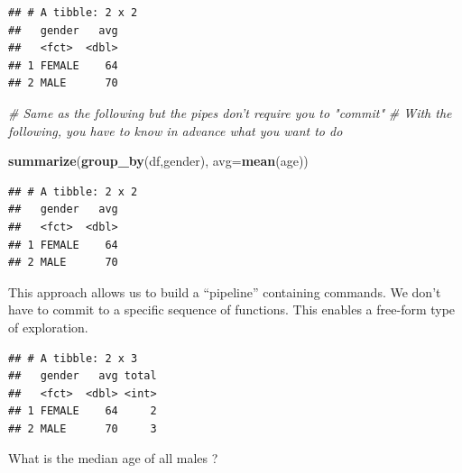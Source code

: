 \documentclass[]{book}
\newenvironment{Shaded}{\begin{snugshade}}{\end{snugshade}}
\newcommand{\CommentTok}[1]{\textcolor[rgb]{0.56,0.35,0.01}{\textit{#1}}}
\newcommand{\DataTypeTok}[1]{\textcolor[rgb]{0.13,0.29,0.53}{#1}}
\newcommand{\KeywordTok}[1]{\textcolor[rgb]{0.13,0.29,0.53}{\textbf{#1}}}
\newcommand{\NormalTok}[1]{#1}
\newcommand{\OperatorTok}[1]{\textcolor[rgb]{0.81,0.36,0.00}{\textbf{#1}}}
\newcommand{\StringTok}[1]{\textcolor[rgb]{0.31,0.60,0.02}{#1}}
\begin{document}
\begin{verbatim}
## # A tibble: 2 x 2
##   gender   avg
##   <fct>  <dbl>
## 1 FEMALE    64
## 2 MALE      70
\end{verbatim}

\begin{Shaded}
\begin{Highlighting}[]
\CommentTok{# Same as the following but the pipes don't require you to "commit"}
\CommentTok{# With the following, you have to know in advance what you want to do}

\KeywordTok{summarize}\NormalTok{(}\KeywordTok{group_by}\NormalTok{(df,gender), }\DataTypeTok{avg=}\KeywordTok{mean}\NormalTok{(age))}
\end{Highlighting}
\end{Shaded}

\begin{verbatim}
## # A tibble: 2 x 2
##   gender   avg
##   <fct>  <dbl>
## 1 FEMALE    64
## 2 MALE      70
\end{verbatim}

This approach allows us to build a ``pipeline'' containing commands. We don't have to commit to a specific sequence of functions. This enables a free-form type of exploration.

\begin{Shaded}
\end{Shaded}

\begin{verbatim}
## # A tibble: 2 x 3
##   gender   avg total
##   <fct>  <dbl> <int>
## 1 FEMALE    64     2
## 2 MALE      70     3
\end{verbatim}

What is the median age of all males ?

\begin{Shaded}
\end{Shaded}
\end{document}
